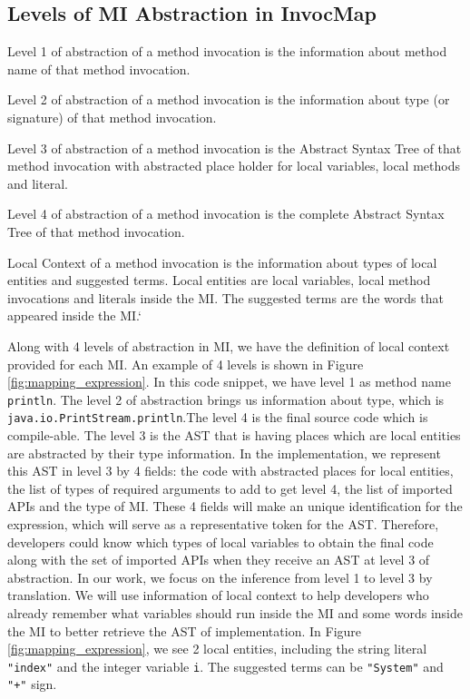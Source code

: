 \subsection{Levels of MI Abstraction in InvocMap}
\begin{definition}
Level 1 of abstraction of a method invocation is the information about method name of that method invocation.
\end{definition}
\begin{definition}
Level 2 of abstraction of a method invocation is the information about type (or signature) of that method invocation.
\end{definition}
\begin{definition}
Level 3 of abstraction of a method invocation is the Abstract Syntax Tree of that method invocation with abstracted place holder for local variables, local methods and literal.
\end{definition}
\begin{definition}
Level 4 of abstraction of a method invocation is the complete Abstract Syntax Tree of that method invocation.
\end{definition}

\begin{definition}
Local Context of a method invocation is the information about types of local entities and suggested terms. Local entities are local variables, local method invocations and literals inside the MI. The suggested terms are the words that appeared inside the MI.`
\end{definition}

Along with 4 levels of abstraction in MI, we have the definition of local context provided for each MI. An example of 4 levels is shown in Figure \ref{fig:mapping_expression}. In this code snippet, we have level 1 as method name \texttt{println}. The level 2 of abstraction brings us information about type, which is \texttt{java.io.PrintStream.println}.The level 4 is the final source code which is compile-able. The level 3 is the AST that is having places which are local entities are abstracted by their type information. In the implementation, we represent this AST in level 3 by 4 fields: the code with abstracted places for local entities, the list of types of required arguments to add to get level 4, the list of imported APIs and the type of MI. These 4 fields will make an unique identification for the expression, which will serve as a representative token for the AST. Therefore, developers could know which types of local variables to obtain the final code along with the set of imported APIs when they receive an AST at level 3 of abstraction. In our work, we focus on the inference from level 1 to level 3 by translation.
We will use information of local context to help developers who already remember what variables should run inside the MI and some words inside the MI to better retrieve the AST of implementation. In Figure \ref{fig:mapping_expression}, we see 2 local entities, including the string literal \texttt{"index"} and the integer variable \texttt{i}. The suggested terms can be \texttt{"System"} and \texttt{"+"} sign. 



